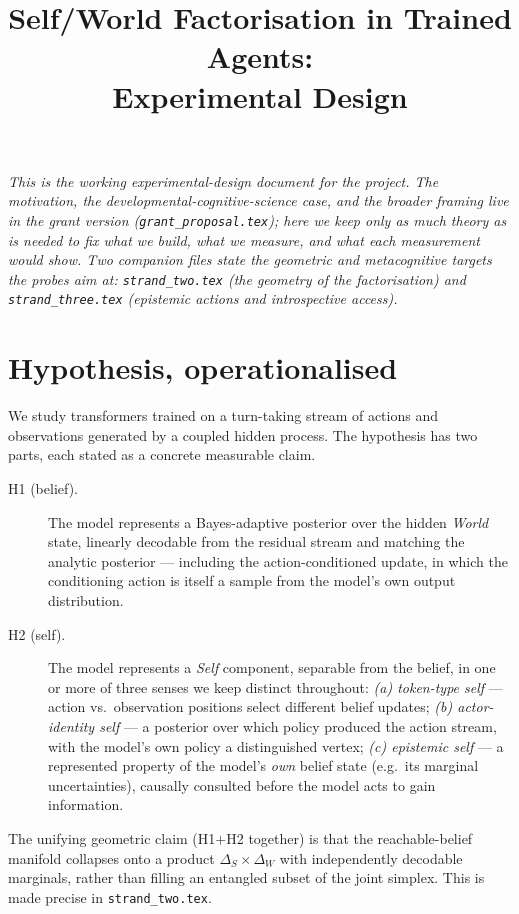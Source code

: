 \documentclass[11pt]{article}
\title{Self/World Factorisation in Trained Agents:\\ Experimental Design}
\author{}
\date{}
\begin{document}
\maketitle

\noindent\emph{This is the working experimental-design document for the project.
The motivation, the developmental-cognitive-science case, and the broader
framing live in the grant version (\texttt{grant\_proposal.tex}); here
we keep only as much theory as is needed to fix what we build, what we measure,
and what each measurement would show. Two companion files state the geometric
and metacognitive targets the probes aim at: \texttt{strand\_two.tex} (the
geometry of the factorisation) and \texttt{strand\_three.tex} (epistemic actions
and introspective access).}

\section{Hypothesis, operationalised}

We study transformers trained on a turn-taking stream of actions and
observations generated by a coupled hidden process. The hypothesis has two
parts, each stated as a concrete measurable claim.

\begin{description}
  \item[H1 (belief).] The model represents a Bayes-adaptive posterior over the
  hidden \emph{World} state, linearly decodable from the residual stream and
  matching the analytic posterior --- including the action-conditioned update,
  in which the conditioning action is itself a sample from the model's own
  output distribution.
  \item[H2 (self).] The model represents a \emph{Self} component, separable from
  the belief, in one or more of three senses we keep distinct throughout:
  \emph{(a) token-type self} --- action vs.\ observation positions select
  different belief updates; \emph{(b) actor-identity self} --- a posterior over
  which policy produced the action stream, with the model's own policy a
  distinguished vertex; \emph{(c) epistemic self} --- a represented property of
  the model's \emph{own} belief state (e.g.\ its marginal uncertainties),
  causally consulted before the model acts to gain information.
\end{description}

The unifying geometric claim (H1$+$H2 together) is that the reachable-belief
manifold collapses onto a product $\Delta_S\times\Delta_W$ with independently
decodable marginals, rather than filling an entangled subset of the joint
simplex. This is made precise in \texttt{strand\_two.tex}.
\end{document}
